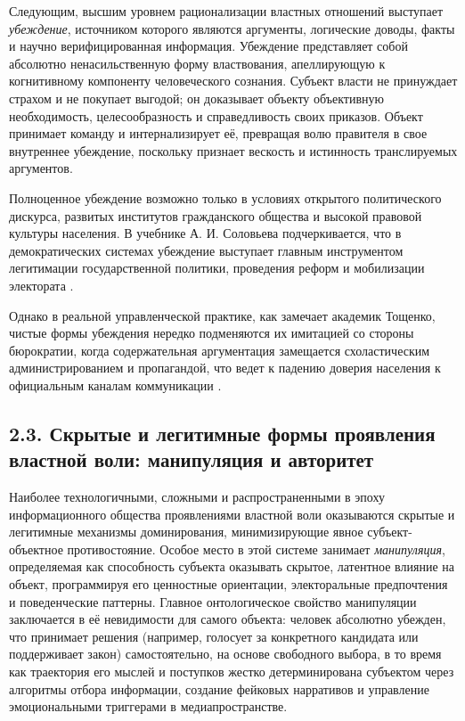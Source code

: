 Следующим, высшим уровнем рационализации властных отношений выступает \textit{убеждение}, источником которого являются аргументы, логические доводы, факты и научно верифицированная информация. Убеждение представляет собой абсолютно ненасильственную форму властвования, апеллирующую к когнитивному компоненту человеческого сознания. Субъект власти не принуждает страхом и не покупает выгодой; он доказывает объекту объективную необходимость, целесообразность и справедливость своих приказов. Объект принимает команду и интернализирует её, превращая волю правителя в свое внутреннее убеждение, поскольку признает вескость и истинность транслируемых аргументов.

Полноценное убеждение возможно только в условиях открытого политического дискурса, развитых институтов гражданского общества и высокой правовой культуры населения. В учебнике А. И. Соловьева подчеркивается, что в демократических системах убеждение выступает главным инструментом легитимации государственной политики, проведения реформ и мобилизации электората \cite{Solovyev}. 

Однако в реальной управленческой практике, как замечает академик Тощенко, чистые формы убеждения нередко подменяются их имитацией со стороны бюрократии, когда содержательная аргументация замещается схоластическим администрированием и пропагандой, что ведет к падению доверия населения к официальным каналам коммуникации \cite{Toschenko}.

\subsection{2.3. Скрытые и легитимные формы проявления властной воли: манипуляция и авторитет}

Наиболее технологичными, сложными и распространенными в эпоху информационного общества проявлениями властной воли оказываются скрытые и легитимные механизмы доминирования, минимизирующие явное субъект-объектное противостояние. Особое место в этой системе занимает \textit{манипуляция}, определяемая как способность субъекта оказывать скрытое, латентное влияние на объект, программируя его ценностные ориентации, электоральные предпочтения и поведенческие паттерны. Главное онтологическое свойство манипуляции заключается в её невидимости для самого объекта: человек абсолютно убежден, что принимает решения (например, голосует за конкретного кандидата или поддерживает закон) самостоятельно, на основе свободного выбора, в то время как траектория его мыслей и поступков жестко детерминирована субъектом через алгоритмы отбора информации, создание фейковых нарративов и управление эмоциональными триггерами в медиапространстве.

